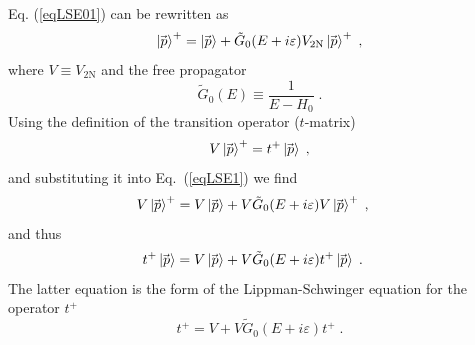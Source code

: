 Eq. (\ref{eqLSE01}) can be rewritten as
\begin{equation}
\ket{\!\vec{\,p}}^{+} = \ket{\!\vec{\,p}} + \tilde{G}_{0}(E + i\varepsilon)V_{\mathrm{2N}}\ket{\!\vec{\,p}}^{+}\;,
\label{eqLSE1}
\end{equation} 
where $V \equiv V_{\mathrm{2N}}$ and the free propagator
\begin{equation}
\tilde{G}_{0}(E) \equiv \frac{1}{E - H_{0}}\;.
\end{equation} 
Using the definition of the transition operator ($t$-matrix)
\begin{equation}
V\ket{\!\vec{\,p}}^{+} = t^{+}\ket{\!\vec{\,p}}\;,
\end{equation}
and substituting it into Eq.~(\ref{eqLSE1}) we find
\begin{equation}
\begin{split}
&V\ket{\!\vec{\,p}}^{+} = V\ket{\!\vec{\,p}} + V\tilde{G}_{0}(E + i\varepsilon)V\ket{\!\vec{\,p}}^{+}\;,
\end{split}
\end{equation}
and thus
\begin{equation}
\begin{split}
&t^{+}\ket{\!\vec{\,p}} = V\ket{\!\vec{\,p}} + V\tilde{G}_{0}(E + i\varepsilon)t^{+}\ket{\!\vec{\,p}}\;.
\end{split}
\end{equation}
The latter equation is the form of the Lippman-Schwinger equation for the operator $t^{+}$
\begin{equation}
t^{+} = V + V\tilde{G}_{0}(E + i\varepsilon)t^{+}\;.
\label{eqt}
\end{equation}
